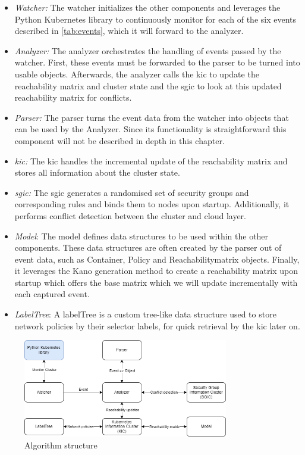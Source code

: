 \begin{itemize}
    \renewcommand{\labelitemi}{\scriptsize$\blacksquare$}
    \item \textit{Watcher:} The watcher initializes the other components and leverages the Python Kubernetes library to continuously monitor for each of the six events described in \autoref{tab:events}, which it will forward to the analyzer.
    \item \textit{Analyzer:} The analyzer orchestrates the handling of events passed by the watcher. First, these events must be forwarded to the parser to be turned into usable objects. Afterwards, the analyzer calls the \acrshort{kic} to update the reachability matrix and cluster state and the \acrshort{sgic} to look at this updated reachability matrix for conflicts.
    \item \textit{Parser:} The parser turns the event data from the watcher into objects that can be used by the Analyzer. Since its functionality is straightforward this component will not be described in depth in this chapter.
    \item \textit{\acrfull{kic}:} The \acrshort{kic} handles the incremental update of the reachability matrix and stores all information about the cluster state.
    \item \textit{\acrfull{sgic}:} The \acrshort{sgic} generates a randomised set of security groups and corresponding rules and binds them to nodes upon startup. Additionally, it performs conflict detection between the cluster and cloud layer.
    \item  \textit{Model}: The model defines data structures to be used within the other components. These data structures are often created by the parser out of event data, such as Container, Policy and Reachabilitymatrix objects. Finally, it leverages the Kano generation method to create a reachability matrix upon startup which offers the base matrix which we will update incrementally with each captured event.
    \item  \textit{LabelTree}: A labelTree is a custom tree-like data structure used to store network policies by their selector labels, for quick retrieval by the \acrshort{kic} later on.
\end{itemize}
\begin{figure}[htbp]
  \centering
  \includegraphics[width=0.8\textwidth]{images/algo-components.png}
  \caption{Algorithm structure}
  \label{fig:algorithm}
\end{figure}



